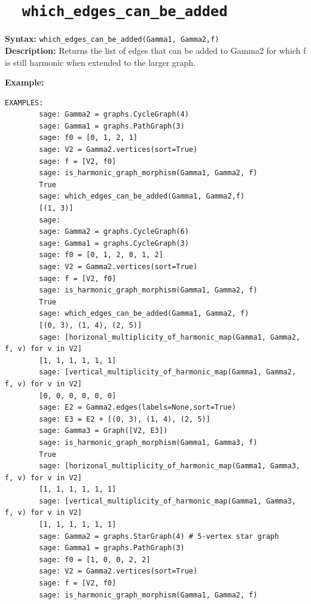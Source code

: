 \documentclass{article}
\begin{document}
\section{\tt \ \ which\_edges\_can\_be\_added}

\textbf{Syntax:} \verb}which_edges_can_be_added(Gamma1, Gamma2,f)}\\

\textbf{Description:}
Returns the list of edges that can be added to
    Gamma2 for which f is still harmonic when extended
    to the larger graph.

\textbf{Example:}
\begin{verbatim}
EXAMPLES:
        sage: Gamma2 = graphs.CycleGraph(4)  
        sage: Gamma1 = graphs.PathGraph(3)   
        sage: f0 = [0, 1, 2, 1]    
        sage: V2 = Gamma2.vertices(sort=True)   
        sage: f = [V2, f0]          
        sage: is_harmonic_graph_morphism(Gamma1, Gamma2, f)
        True
        sage: which_edges_can_be_added(Gamma1, Gamma2,f) 
        [(1, 3)]
        sage:
        sage: Gamma2 = graphs.CycleGraph(6) 
        sage: Gamma1 = graphs.CycleGraph(3) 
        sage: f0 = [0, 1, 2, 0, 1, 2] 
        sage: V2 = Gamma2.vertices(sort=True)  
        sage: f = [V2, f0]          
        sage: is_harmonic_graph_morphism(Gamma1, Gamma2, f) 
        True
        sage: which_edges_can_be_added(Gamma1, Gamma2, f) 
        [(0, 3), (1, 4), (2, 5)]
        sage: [horizonal_multiplicity_of_harmonic_map(Gamma1, Gamma2, f, v) for v in V2] 
        [1, 1, 1, 1, 1, 1]
        sage: [vertical_multiplicity_of_harmonic_map(Gamma1, Gamma2, f, v) for v in V2]  
        [0, 0, 0, 0, 0, 0]
        sage: E2 = Gamma2.edges(labels=None,sort=True) 
        sage: E3 = E2 + [(0, 3), (1, 4), (2, 5)] 
        sage: Gamma3 = Graph([V2, E3])     
        sage: is_harmonic_graph_morphism(Gamma1, Gamma3, f)  
        True
        sage: [horizonal_multiplicity_of_harmonic_map(Gamma1, Gamma3, f, v) for v in V2]
        [1, 1, 1, 1, 1, 1]
        sage: [vertical_multiplicity_of_harmonic_map(Gamma1, Gamma3, f, v) for v in V2] 
        [1, 1, 1, 1, 1, 1]
        sage: Gamma2 = graphs.StarGraph(4) # 5-vertex star graph
        sage: Gamma1 = graphs.PathGraph(3)                                              
        sage: f0 = [1, 0, 0, 2, 2]                                                      
        sage: V2 = Gamma2.vertices(sort=True)                                                    
        sage: f = [V2, f0]                                                              
        sage: is_harmonic_graph_morphism(Gamma1, Gamma2, f)                             

\end{verbatim}
\end{document}

